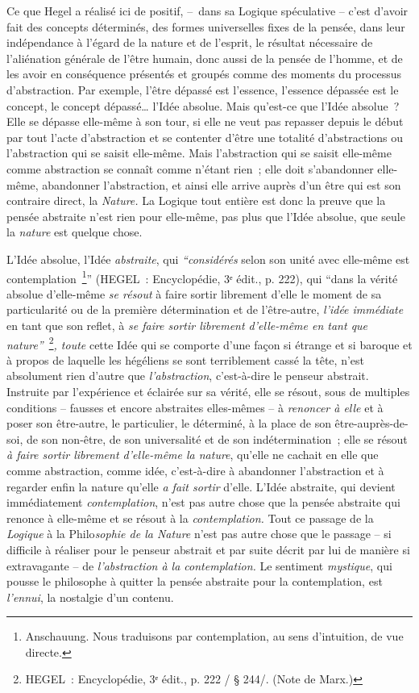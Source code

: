 \documentclass[french,twoside]{book} %
\begin{document}
Ce que Hegel a réalisé ici de positif, – dans sa Logique spéculative – c’est d’avoir fait des concepts déterminés, des formes universelles fixes de la pensée, dans leur indépendance à l’égard de la nature et de l’esprit, le résultat nécessaire de l’aliénation générale de l’être humain, donc aussi de la pensée de l’homme, et de les avoir en conséquence présentés et groupés comme des moments du processus d’abstraction. Par exemple, l’être dépassé est l’essence, l’essence dépassée est le concept, le concept dépassé… l’Idée absolue. Mais qu’est-ce que l’Idée absolue ? Elle se dépasse elle-même à son tour, si elle ne veut pas repasser depuis le début par tout l’acte d’abstraction et se contenter d’être une totalité d’abstractions ou l’abstraction qui se saisit elle-même. Mais l’abstraction qui se saisit elle-même comme abstraction se connaît comme n’étant rien ; elle doit s’abandonner elle-même, abandonner l’abstraction, et ainsi elle arrive auprès d’un être qui est son contraire direct, la \emph{Nature.} La Logique tout entière est donc la preuve que la pensée abstraite n’est rien pour elle-même, pas plus que l’Idée absolue, que seule la \emph{nature} est quelque chose.\par
[XXXII] L’Idée absolue, l’Idée \emph{abstraite}, qui \emph{“considérés} selon son unité avec elle-même est contemplation \footnote{Anschauung. Nous traduisons par contemplation, au sens d’intuition, de vue directe.}” (HEGEL : Encyclopédie, 3ᵉ édit., p. 222), qui “dans la vérité absolue d’elle-même \emph{se résout} à faire sortir librement d’elle le moment de sa particularité ou de la première détermination et de l’être-autre, \emph{l’idée immédiate} en tant que son reflet, à \emph{se faire sortir librement d’elle-même en tant que nature”} \footnote{HEGEL : Encyclopédie, 3ᵉ édit., p. 222 / § 244/. (Note de Marx.)}\emph{, toute} cette Idée qui se comporte d’une façon si étrange et si baroque et à propos de laquelle les hégéliens se sont terriblement cassé la tête, n’est absolument rien d’autre que \emph{l’abstraction}, c’est-à-dire le penseur abstrait. Instruite par l’expérience et éclairée sur sa vérité, elle se résout, sous de multiples conditions – fausses et encore abstraites elles-mêmes – à \emph{renoncer à elle} et à poser son être-autre, le particulier, le déterminé, à la place de son être-auprès-de-soi, de son non-être, de son universalité et de son indétermination ; elle se résout \emph{à faire sortir librement d’elle-même la nature}, qu’elle ne cachait en elle que comme abstraction, comme idée, c’est-à-dire à abandonner l’abstraction et à regarder enfin la nature qu’elle \emph{a fait sortir} d’elle. L’Idée abstraite, qui devient immédiatement \emph{contemplation}, n’est pas autre chose que la pensée abstraite qui renonce à elle-même et se résout à la \emph{contemplation.} Tout ce passage de la \emph{Logique} à la Philo\emph{sophie de la Nature} n’est pas autre chose que le passage – si difficile à réaliser pour le penseur abstrait et par suite décrit par lui de manière si extravagante – de \emph{l’abstraction à la contemplation.} Le sentiment \emph{mystique}, qui pousse le philosophe à quitter la pensée abstraite pour la contemplation, est \emph{l’ennui}, la nostalgie d’un contenu.\par
\end{document}
